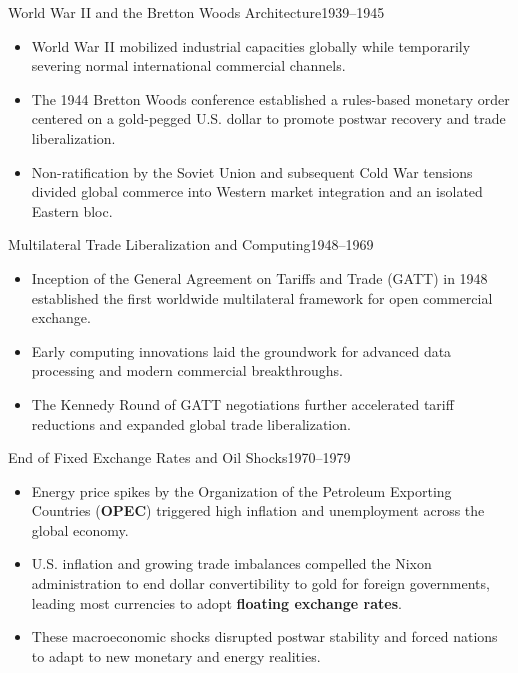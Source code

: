 \documentclass[10pt, aspectratio=169]{beamer}
\begin{document}
	\begin{frame}{World War II and the Bretton Woods Architecture}{1939--1945}
		\begin{itemize}
			\item World War II mobilized industrial capacities globally while temporarily severing normal international commercial channels.
			\vspace{0.25cm}
			\item The 1944 Bretton Woods conference established a rules-based monetary order centered on a gold-pegged U.S. dollar to promote postwar recovery and trade liberalization.
			\vspace{0.25cm}
			\item Non-ratification by the Soviet Union and subsequent Cold War tensions divided global commerce into Western market integration and an isolated Eastern bloc.
		\end{itemize}
	\end{frame}
	
	\begin{frame}{Multilateral Trade Liberalization and Computing}{1948--1969}
		\begin{itemize}
			\item Inception of the General Agreement on Tariffs and Trade (GATT) in 1948 established the first worldwide multilateral framework for open commercial exchange.
			\vspace{0.25cm}
			\item Early computing innovations laid the groundwork for advanced data processing and modern commercial breakthroughs.
			\vspace{0.25cm}
			\item The Kennedy Round of GATT negotiations further accelerated tariff reductions and expanded global trade liberalization.
		\end{itemize}
	\end{frame}
	
	\begin{frame}{End of Fixed Exchange Rates and Oil Shocks}{1970--1979}
		\begin{itemize}
			\item Energy price spikes by the Organization of the Petroleum Exporting Countries (\textbf{OPEC}) triggered high inflation and unemployment across the global economy.
			\vspace{0.25cm}
			\item U.S. inflation and growing trade imbalances compelled the Nixon administration to end dollar convertibility to gold for foreign governments, leading most currencies to adopt \textbf{floating exchange rates}.
			\vspace{0.25cm}
			\item These macroeconomic shocks disrupted postwar stability and forced nations to adapt to new monetary and energy realities.
		\end{itemize}
	\end{frame}
	
\end{document}
